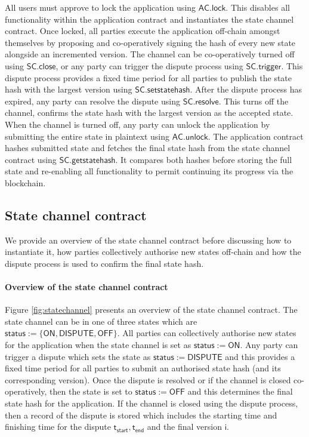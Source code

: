 \documentclass{llncs}
\newcommand{\chanstatus}{\mathsf{status}}
\newcommand{\chanon}{\mathsf{ON}}
\newcommand{\chandispute}{\mathsf{DISPUTE}}
\newcommand{\chanoff}{\mathsf{OFF}}
\newcommand{\monotoniccounter}{\mathsf{i}}
\newcommand{\statechanneldispute}{\mathsf{SC}.\mathsf{trigger}}
\newcommand{\statechannelsetstate}{\mathsf{SC}.\mathsf{setstatehash}}
\newcommand{\statechannelresolve}{\mathsf{SC}.\mathsf{resolve}}
\newcommand{\statechannelgetcommitment}{\mathsf{SC}.\mathsf{getstatehash}}
\newcommand{\statechannelclose}{\mathsf{SC}.\mathsf{close}}
\newcommand{\applock}{\mathsf{AC.lock}}
\newcommand{\appunlock}{\mathsf{AC.unlock}}
\newcommand{\timestart}{\mathsf{t}_{\mathsf{start}}}
\newcommand{\timeend}{\mathsf{t}_{\mathsf{end}}}
\begin{document}
All users must approve to lock the application using $\applock$.
This disables all functionality within the application contract and instantiates the state channel contract. 
Once locked, all parties execute the application off-chain amongst themselves by proposing  and co-operatively signing the hash of every new state alongside an incremented version. %
The channel can be co-operatively turned off using $\statechannelclose$, or any party can trigger the dispute process using $\statechanneldispute$.
This dispute process provides  a fixed time period  for all parties to publish the state hash with the largest version using $\statechannelsetstate$. 
After the dispute process has expired, any party can resolve the dispute using $\statechannelresolve$.
This turns off the channel, confirms the state hash with the largest version as the accepted state.
When the channel is turned off, any party can unlock the application by submitting the entire state in plaintext using $\appunlock$. 
The application contract hashes submitted state and fetches the final state hash from the state channel contract using $\statechannelgetcommitment$.
It compares both hashes before storing the full state and re-enabling all functionality to permit continuing its progress via the blockchain. 

\subsection{State channel contract}

We provide an overview of the state channel contract before discussing how to instantiate it,  how parties collectively authorise new states off-chain and how the dispute process is used to confirm the final state hash. 

\paragraph{Overview of the state channel contract} 
Figure \ref{fig:statechannel} presents an overview of the state channel contract.
The state channel can be in one of three states which are $\chanstatus := \{\chanon, \chandispute, \chanoff\}$.
All parties can collectively authorise new states for the application when the state channel is set as $\chanstatus := \chanon$.
Any party can trigger a dispute which sets the state as $\chanstatus := \chandispute$ and this provides a fixed time period for all parties to submit an authorised state hash (and its corresponding version).
Once the dispute is resolved or if the channel is closed co-operatively, then the state is set to $\chanstatus := \chanoff$ and this determines the final state hash for the application. 
If the channel is closed using the dispute process, then a record of the dispute is stored which includes the starting time and finishing time for the dispute $\timestart, \timeend$ and the final version $\monotoniccounter$.
\end{document}
